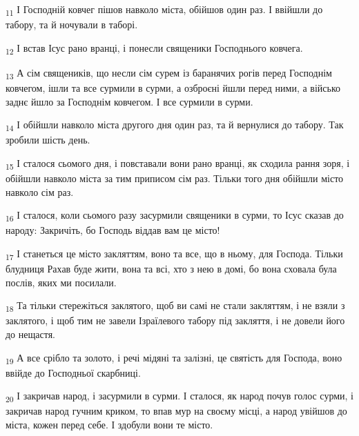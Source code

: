 \begin{tcolorbox}
\textsubscript{11} І Господній ковчег пішов навколо міста, обійшов один раз. І ввійшли до табору, та й ночували в таборі.
\end{tcolorbox}
\begin{tcolorbox}
\textsubscript{12} І встав Ісус рано вранці, і понесли священики Господнього ковчега.
\end{tcolorbox}
\begin{tcolorbox}
\textsubscript{13} А сім священиків, що несли сім сурем із баранячих рогів перед Господнім ковчегом, ішли та все сурмили в сурми, а озброєні йшли перед ними, а військо заднє йшло за Господнім ковчегом. І все сурмили в сурми.
\end{tcolorbox}
\begin{tcolorbox}
\textsubscript{14} І обійшли навколо міста другого дня один раз, та й вернулися до табору. Так зробили шість день.
\end{tcolorbox}
\begin{tcolorbox}
\textsubscript{15} І сталося сьомого дня, і повставали вони рано вранці, як сходила рання зоря, і обійшли навколо міста за тим приписом сім раз. Тільки того дня обійшли місто навколо сім раз.
\end{tcolorbox}
\begin{tcolorbox}
\textsubscript{16} І сталося, коли сьомого разу засурмили священики в сурми, то Ісус сказав до народу: Закричіть, бо Господь віддав вам це місто!
\end{tcolorbox}
\begin{tcolorbox}
\textsubscript{17} І станеться це місто закляттям, воно та все, що в ньому, для Господа. Тільки блудниця Рахав буде жити, вона та всі, хто з нею в домі, бо вона сховала була послів, яких ми посилали.
\end{tcolorbox}
\begin{tcolorbox}
\textsubscript{18} Та тільки стережіться заклятого, щоб ви самі не стали закляттям, і не взяли з заклятого, і щоб тим не завели Ізраїлевого табору під закляття, і не довели його до нещастя.
\end{tcolorbox}
\begin{tcolorbox}
\textsubscript{19} А все срібло та золото, і речі мідяні та залізні, це святість для Господа, воно ввійде до Господньої скарбниці.
\end{tcolorbox}
\begin{tcolorbox}
\textsubscript{20} І закричав народ, і засурмили в сурми. І сталося, як народ почув голос сурми, і закричав народ гучним криком, то впав мур на своєму місці, а народ увійшов до міста, кожен перед себе. І здобули вони те місто.
\end{tcolorbox}
